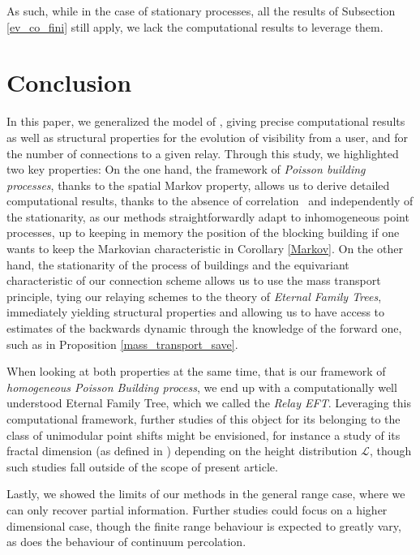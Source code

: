 \documentclass[10pt,english,a4paper]{smfart}
\theoremstyle{definition}
\theoremstyle{remark}
\begin{document}
As such, while in the case of stationary processes, all the results of Subsection \ref{ev_co_fini} still apply, we lack the computational results to leverage them.
\section*{Conclusion}

In this paper, we generalized the model of \cite{Junse_Francois}, giving precise computational results as well as structural properties for the evolution of visibility from a user, and for the number of connections to a given relay. Through this study, we highlighted two key properties: On the one hand, the framework of \textit{Poisson building processes}, thanks to the spatial Markov property, allows us to derive detailed computational results, thanks to the absence of correlation \textemdash \ and independently of the stationarity, as our methods straightforwardly adapt to inhomogeneous point processes, up to keeping in memory the position of the blocking building if one wants to keep the Markovian characteristic in Corollary \ref{Markov}. On the other hand, the stationarity of the process of buildings and the equivariant characteristic of our connection scheme allows us to use the mass transport principle, tying our relaying schemes to the theory of \textit{Eternal Family Trees}, immediately yielding structural properties and allowing us to have access to estimates of the backwards dynamic through the knowledge of the forward one, such as in Proposition \ref{mass_transport_save}.

When looking at both properties at the same time, that is our framework of \textit{homogeneous Poisson Building process}, we end up with a computationally well understood Eternal Family Tree, which we called the \textit{Relay EFT}. Leveraging this computational framework, further studies of this object for its belonging to the class of unimodular point shifts might be envisioned, for instance a study of its fractal dimension (as defined in \cite{unimod_dim}) depending on the height distribution $\mathcal{L}$, though such studies fall outside of the scope of present article.

Lastly, we showed the limits of our methods in the general range case, where we can only recover partial information. Further studies could focus on a higher dimensional case, though the finite range behaviour is expected to greatly vary, as does the behaviour of continuum percolation.
\newpage
\printbibliography
\end{document}
